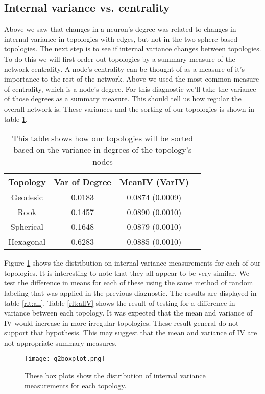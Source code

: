 \subsection{Internal variance vs. centrality}
Above we saw that changes in a neuron's degree was related to changes in
internal variance in topologies with edges, but not in the two sphere based
topologies. The next step is to see if internal variance changes between
topologies.  To do this we will first order out topologies by a summary
measure of the network centrality.  A node's centrality can be thought of as a
measure of it's importance to the rest of the network. Above we used the most
common measure of centrality, which is a node's degree.  For this diagnostic
we'll take the variance of those degrees as a summary measure.  This should
tell us how regular the overall network is.  These variances and the sorting
of our topologies is shown in table \ref{vardeg}.

\begin{table}[hbt]
\centering
\caption{This table shows how our topologies will be sorted based on the
variance in degrees of the topology's nodes}
\label{vardeg}
\begin{tabular}{|c|c|c|c|}
\hline
Topology & Var of Degree & MeanIV (VarIV)\\
\hline
Geodesic & 0.0183 & 0.0874 (0.0009)\\
Rook & 0.1457 & 0.0890 (0.0010)\\
Spherical & 0.1648 & 0.0879 (0.0010)\\
Hexagonal & 0.6283 & 0.0885 (0.0010)\\
\hline
\end{tabular}
\end{table}

Figure \ref{q2boxplot} shows the distribution on internal variance
measurements for each of our topologies.  It is interesting to note that
they all appear to be very similar. We test the difference in means for
each of these using the same method of random labeling that was applied in the
previous diagnostic. The results are displayed in table \ref{rlt:all}. Table
\ref{rlt:allV} shows the result of testing for a difference in variance
between each topology.  It was expected that the mean and variance of IV would
increase in more irregular topologies.  These result general do not support
that hypothesis. This may suggest that the mean and variance of IV are not
appropriate summary measures.

\begin{figure}[hbt]
\centering
\texttt{[image: q2boxplot.png]}
\caption{These box plots show the distribution of internal variance measurements
for each topology.}
\label{q2boxplot}
\end{figure}


